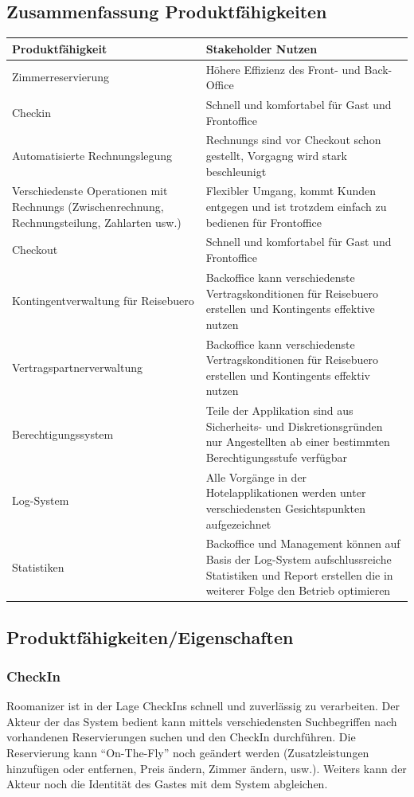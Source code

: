 \documentclass[10pt,a4paper,titlepage]{article}
\begin{document}
\subsection{Zusammenfassung Produktfähigkeiten}
\begin{tabular}{|p{5.7cm}|p{5.7cm}|}
	\hline
	\textbf{Produktfähigkeit} &
	\textbf{Stakeholder Nutzen}
	\\
	\hline
	Zimmerreservierung &
	Höhere Effizienz des Front- und Back-Office
	\\
	\hline
	\Gls{Checkin} &
	Schnell und komfortabel für \Gls{Gast} und \Gls{Frontoffice}
	\\
	\hline
	Automatisierte Rechnungslegung &
	\Glspl{Rechnung} sind vor \Gls{Checkout} schon gestellt, Vorgagng wird stark beschleunigt
	\\
	\hline
	Verschiedenste Operationen mit \Glspl{Rechnung} (\Gls{Zwischenrechnung}, Rechnungsteilung, Zahlarten usw.) &
	Flexibler Umgang, kommt \Gls{Kunde}n entgegen und ist trotzdem einfach zu bedienen für \Gls{Frontoffice}
	\\
	\hline
	\Gls{Checkout} &
	Schnell und komfortabel für Gast und \Gls{Frontoffice}
	\\
	\hline
	Kontingentverwaltung für \Gls{Reisebuero} &
	\Gls{Backoffice} kann verschiedenste Vertragskonditionen für \Gls{Reisebuero} erstellen und \Glspl{Kontingent} effektive nutzen
	\\
	\hline
	Vertragspartnerverwaltung &
	\Gls{Backoffice} kann verschiedenste Vertragskonditionen für \Gls{Reisebuero} erstellen und \Glspl{Kontingent} effektiv nutzen
	\\
	\hline
	Berechtigungssystem &
	Teile der Applikation sind aus Sicherheits- und Diskretionsgründen nur Angestellten ab einer bestimmten Berechtigungsstufe verfügbar
	\\
	\hline
	Log-System &
	Alle Vorgänge in der Hotelapplikationen werden unter verschiedensten Gesichtspunkten aufgezeichnet
	\\
	\hline
	Statistiken &
	\Gls{Backoffice} und Management können auf Basis der Log-System aufschlussreiche Statistiken und Report erstellen die in weiterer Folge den Betrieb optimieren
	\\
	\hline
\end{tabular}

\subsection{Produktfähigkeiten/Eigenschaften}
\subsubsection{CheckIn }
Roomanizer ist in der Lage CheckIns schnell und zuverlässig zu verarbeiten. Der Akteur der das System bedient kann mittels  verschiedensten Suchbegriffen nach vorhandenen Reservierungen suchen und den CheckIn durchführen. Die Reservierung kann "`On-The-Fly"' noch geändert werden (Zusatzleistungen hinzufügen oder entfernen, Preis ändern, Zimmer ändern, usw.). Weiters kann der Akteur noch die Identität des Gastes mit dem System abgleichen.
\end{document}
